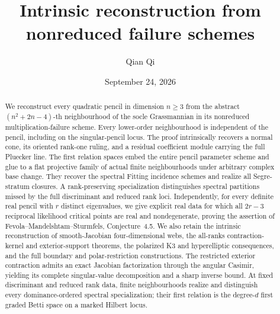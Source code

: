 \title[Intrinsic reconstruction from failure schemes]{Intrinsic reconstruction from nonreduced failure schemes}
\author{Qian Qi}
\date{September 24, 2026}
\begin{abstract}
We reconstruct every quadratic pencil in dimension \(n\ge3\)
from the abstract \((n^2+2n-4)\)-th neighbourhood of the socle
Grassmannian in its nonreduced multiplication-failure scheme.
Every lower-order neighbourhood is independent of the pencil,
including on the singular-pencil locus. The proof intrinsically
recovers a normal cone, its oriented rank-one ruling, and a residual
coefficient module carrying the full Pluecker line. The first
relation spaces embed the entire pencil parameter scheme and glue
to a flat projective family of actual finite neighbourhoods under
arbitrary complex base change. They recover the spectral Fitting
incidence schemes and realize all Segre-stratum closures. A
rank-preserving specialization distinguishes spectral partitions
missed by the full discriminant and reduced rank loci. Independently,
for every definite real pencil with \(r\) distinct eigenvalues,
we give explicit real data for which all \(2r-3\) reciprocal
likelihood critical points are real and nondegenerate, proving the
assertion of Fevola--Mandelshtam--Sturmfels, Conjecture~4.5. We also
retain the intrinsic reconstruction of smooth-Jacobian four-dimensional
webs, the all-ranks contraction-kernel and exterior-support theorems,
the polarized K3 and hyperelliptic consequences, and the full boundary
and polar-restriction constructions. The restricted exterior contraction
admits an exact Jacobian factorization through the angular Casimir,
yielding its complete singular-value decomposition and a sharp inverse
bound. At fixed discriminant and reduced rank data, finite neighbourhoods
realize and distinguish every dominance-ordered spectral specialization;
their first relation is the degree-\(d\) first graded Betti space
on a marked Hilbert locus.
\end{abstract}
\maketitle
